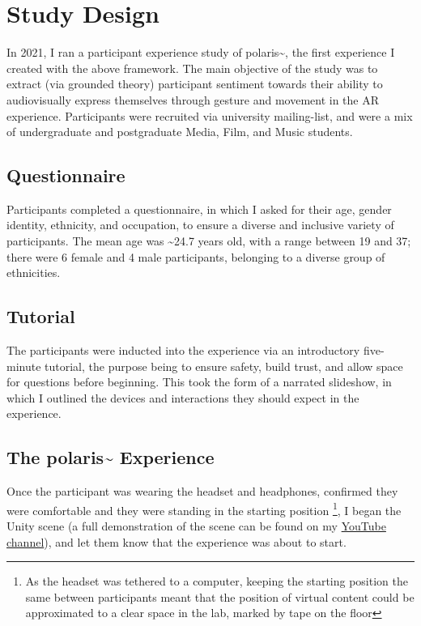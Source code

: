\section{Study Design}\label{sec: polaris-study}
In 2021, I ran a participant experience study of polaris\textasciitilde{}, the first experience I created with the above framework. The main objective of the study was to extract (via grounded theory) participant sentiment towards their ability to audiovisually express themselves through gesture and movement in the AR experience. Participants were recruited via university mailing-list, and were a mix of undergraduate and postgraduate Media, Film, and Music students.

\subsection{Questionnaire}\label{sec: polaris-study-questionnaire}
Participants completed a questionnaire, in which I asked for their age, gender identity, ethnicity, and occupation, to ensure a diverse and inclusive variety of participants. The mean age was \textasciitilde{}24.7 years old, with a range between 19 and 37; there were 6 female and 4 male participants, belonging to a diverse group of ethnicities.

\subsection{Tutorial}\label{sec: polaris-study-tutorial}
The participants were inducted into the experience via an introductory five-minute tutorial, the purpose being to ensure safety, build trust, and allow space for questions before beginning. This took the form of a narrated slideshow, in which I outlined the devices and interactions they should expect in the experience.

\subsection{The polaris\textasciitilde{} Experience}\label{sec: polaris-study-experience}
Once the participant was wearing the headset and headphones, confirmed they were comfortable and they were standing in the starting position \footnote{As the headset was tethered to a computer, keeping the starting position the same between participants meant that the position of virtual content could be approximated to a clear space in the lab, marked by tape on the floor}, I began the Unity scene (a full demonstration of the scene can be found on my \href{https://youtu.be/lCBgMs8ULj0}{YouTube channel}), and let them know that the experience was about to start.

